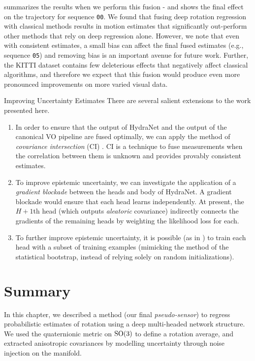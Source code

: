  summarizes the results when we perform this fusion - and  shows the final effect on the trajectory for sequence \texttt{00}. We found that fusing deep rotation regression with classical methods results in motion estimates that significantly out-perform other methods that rely on deep regression alone. However, we note that even with consistent estimates, a small bias can affect the final fused estimates (e.g., sequence \texttt{05}) and removing bias is an important avenue for future work. Further, the KITTI dataset contains few deleterious effects that negatively affect classical algorithms, and therefore we expect that this fusion would produce even more pronounced improvements on more varied visual data.

\begin{remark}{Improving Uncertainty Estimates}
	There are several salient extensions to the work presented here. 
	\begin{enumerate}
	\item 	In order to ensure that the output of HydraNet and the output of the canonical VO pipeline are fused optimally, we can apply the method of \textit{covariance intersection} (CI) \citep{julier2007using}. CI is a technique to fuse measurements when the correlation between them is unknown and provides provably consistent estimates.
	\item To improve epistemic uncertainty, we can investigate the application of a \textit{gradient blockade} \citep{brachmann2019ngransac} between the heads and body of HydraNet. A gradient blockade would ensure that each head learns independently. At present, the $H+1$th head (which outputs \textit{aleatoric} covariance) indirectly connects the gradients of the remaining heads by weighting the likelihood loss for each.
	\item To further improve epistemic uncertainty, it is possible (as in \cite{Osband2016}) to train each head with a subset of training examples (mimicking the method of the statistical bootstrap, instead of relying solely on random initializations).
	\end{enumerate}
 \end{remark}



\section{Summary}
In this chapter, we described a method (our final \textit{pseudo-sensor}) to regress probabilistic estimates of rotation using a deep multi-headed network structure. We used the quaternionic metric on $\mathrm{SO}(3)$ to define a rotation average, and extracted anisotropic covariances by modelling uncertainty through noise injection on the manifold. 


